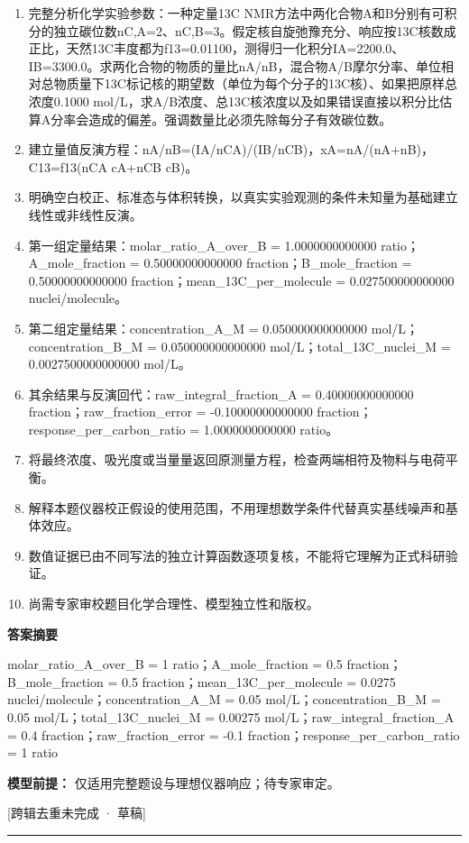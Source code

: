 \documentclass[UTF8,11pt,a4paper]{ctexart}
\begin{document}
\begin{enumerate}
\item 完整分析化学实验参数：一种定量13C NMR方法中两化合物A和B分别有可积分的独立碳位数nC,A=2、nC,B=3。假定核自旋弛豫充分、响应按13C核数成正比，天然13C丰度都为f13=0.01100，测得归一化积分IA=2200.0、IB=3300.0。求两化合物的物质的量比nA/nB，混合物A/B摩尔分率、单位相对总物质量下13C标记核的期望数（单位为每个分子的13C核）、如果把原样总浓度0.1000 mol/L，求A/B浓度、总13C核浓度以及如果错误直接以积分比估算A分率会造成的偏差。强调数量比必须先除每分子有效碳位数。
\item 建立量值反演方程：nA/nB=(IA/nCA)/(IB/nCB)，xA=nA/(nA+nB)，C13=f13(nCA cA+nCB cB)。
\item 明确空白校正、标准态与体积转换，以真实实验观测的条件未知量为基础建立线性或非线性反演。
\item 第一组定量结果：molar\_ratio\_A\_over\_B = 1.0000000000000 ratio；A\_mole\_fraction = 0.50000000000000 fraction；B\_mole\_fraction = 0.50000000000000 fraction；mean\_13C\_per\_molecule = 0.027500000000000 nuclei/molecule。
\item 第二组定量结果：concentration\_A\_M = 0.050000000000000 mol/L；concentration\_B\_M = 0.050000000000000 mol/L；total\_13C\_nuclei\_M = 0.0027500000000000 mol/L。
\item 其余结果与反演回代：raw\_integral\_fraction\_A = 0.40000000000000 fraction；raw\_fraction\_error = -0.10000000000000 fraction；response\_per\_carbon\_ratio = 1.0000000000000 ratio。
\item 将最终浓度、吸光度或当量量返回原测量方程，检查两端相符及物料与电荷平衡。
\item 解释本题仪器校正假设的使用范围，不用理想数学条件代替真实基线噪声和基体效应。
\item 数值证据已由不同写法的独立计算函数逐项复核，不能将它理解为正式科研验证。
\item 尚需专家审校题目化学合理性、模型独立性和版权。
\end{enumerate}
\noindent\textbf{答案摘要}\par
molar\_ratio\_A\_over\_B = 1 ratio；A\_mole\_fraction = 0.5 fraction；B\_mole\_fraction = 0.5 fraction；mean\_13C\_per\_molecule = 0.0275 nuclei/molecule；concentration\_A\_M = 0.05 mol/L；concentration\_B\_M = 0.05 mol/L；total\_13C\_nuclei\_M = 0.00275 mol/L；raw\_integral\_fraction\_A = 0.4 fraction；raw\_fraction\_error = -0.1 fraction；response\_per\_carbon\_ratio = 1 ratio\par
\noindent\textbf{模型前提：}
仅适用完整题设与理想仪器响应；待专家审定。\par
\noindent\textcolor{red!65!black}{[跨辑去重未完成 · 草稿]} \par
\medskip\hrule\medskip
{}
\end{document}
